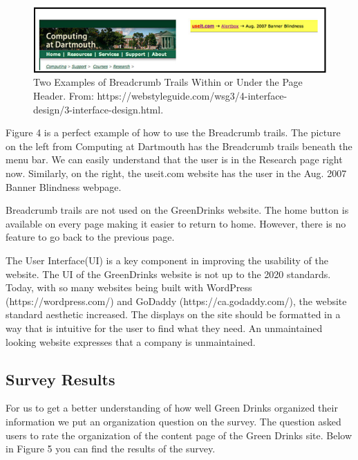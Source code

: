 \documentclass[12pt]{article}
\begin{document}
\begin{figure}[ht]
\centering
\includegraphics[width=1.0\textwidth]{f4}
\caption[Examples of Breadcrumb Trails]{Two Examples of Breadcrumb Trails Within or Under the Page Header. 
From:  https://webstyleguide.com/wsg3/4-interface-design/3-interface-design.html\footnotemark.}
\end{figure} 

Figure 4 is a perfect example of how to use the Breadcrumb trails. The picture on the left from Computing at Dartmouth has the Breadcrumb trails beneath the menu bar. We can easily understand that the user is in the Research page right now. Similarly, on the right, the useit.com website has the user in the Aug. 2007 Banner Blindness webpage.

Breadcrumb trails are not used on the GreenDrinks website. The home button is available on every page making it easier to return to home. However, there is no feature to go back to the previous page.

The User Interface(UI) is a key component in improving the usability of the website. The UI of the GreenDrinks website is not up to the 2020 standards.  Today, with so many websites being built with WordPress (https://wordpress.com/) and GoDaddy (https://ca.godaddy.com/), the website standard aesthetic increased.  The displays on the site should be formatted in a way that is intuitive for the user to find what they need.  An unmaintained looking website expresses that a company is unmaintained.


\subsection{Survey Results}
For us to get a better understanding of how well Green Drinks organized their information we put an organization question on the survey. The question asked users to rate the organization of the content page of the Green Drinks site. Below in Figure 5 you can find the results of the survey.
\end{document}
